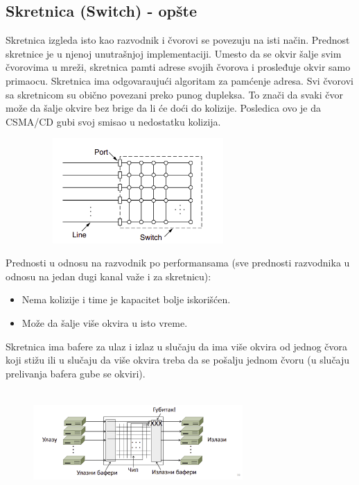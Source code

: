 \documentclass[a4paper]{article}
\begin{document}
    \subsection{Skretnica (Switch) - opšte}
        Skretnica izgleda isto kao razvodnik i čvorovi se povezuju na isti način. Prednost skretnice
        je u njenoj unutrašnjoj implementaciji. Umesto da se okvir šalje svim čvorovima u mreži, 
        skretnica pamti adrese svojih čvorova i prosleđuje okvir samo primaocu. Skretnica ima 
        odgovaraujući algoritam za pamćenje adresa. Svi čvorovi sa skretnicom su obično povezani
        preko punog dupleksa. To znači da svaki čvor može da šalje okvire bez brige da li
        će doći do kolizije. Posledica ovo je da CSMA/CD gubi svoj smisao u nedostatku kolizija.
        \begin{figure}[H]
            \begin{center}
                \includegraphics[width=80mm,height=40mm]{Slike/skretnica.png}
            \end{center}
        \end{figure}
        Prednosti u odnosu na razvodnik po performansama (sve prednosti razvodnika u odnosu na
        jedan dugi kanal važe i za skretnicu):
        \begin{itemize}
            \item Nema kolizije i time je kapacitet bolje iskorišćen.
            \item Može da šalje više okvira u isto vreme.
        \end{itemize}
        Skretnica ima bafere za ulaz i izlaz u slučaju da ima više okvira od jednog čvora koji 
        stižu ili u slučaju da više okvira treba da se pošalju jednom čvoru (u slučaju prelivanja
        bafera gube se okviri).
        \begin{figure}[H]
            \begin{center}
                \includegraphics[width=80mm,height=40mm]{Slike/skretnica_baferi.png}
            \end{center}
        \end{figure}
\end{document}
